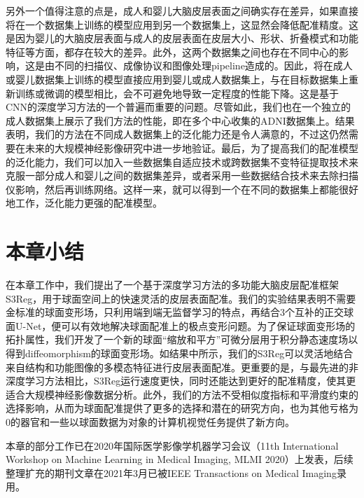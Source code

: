 另外一个值得注意的点是，成人和婴儿大脑皮层表面之间确实存在差异，如果直接将在一个数据集上训练的模型应用到另一个数据集上，这显然会降低配准精度。这是因为婴儿的大脑皮层表面与成人的皮层表面在皮层大小、形状、折叠模式和功能特征等方面，都存在较大的差异\cite{li2015construction}。此外，这两个数据集之间也存在不同中心的影响，这是由不同的扫描仪、成像协议和图像处理pipeline造成的。因此，将在成人或婴儿数据集上训练的模型直接应用到婴儿或成人数据集上，与在目标数据集上重新训练或微调的模型相比，会不可避免地导致一定程度的性能下降。这是基于CNN的深度学习方法的一个普遍而重要的问题\cite{shen2017deep}。尽管如此，我们也在一个独立的成人数据集上展示了我们方法的性能，即在多个中心收集的ADNI数据集上。结果表明，我们的方法在不同成人数据集上的泛化能力还是令人满意的，不过这仍然需要在未来的大规模神经影像研究中进一步地验证。最后，为了提高我们的配准模型的泛化能力，我们可以加入一些数据集自适应技术\cite{he2020self}或跨数据集不变特征提取技术\cite{zhong2020dika}来克服一部分成人和婴儿之间的数据集差异，或者采用一些数据结合技术\cite{zhao2019harmonization}来去除扫描仪影响，然后再训练网络。这样一来，就可以得到一个在不同的数据集上都能很好地工作，泛化能力更强的配准模型。

\section{本章小结}
在本章工作中，我们提出了一个基于深度学习方法的多功能大脑皮层配准框架S3Reg，用于球面空间上的快速灵活的皮层表面配准。我们的实验结果表明不需要金标准的球面变形场，只利用端到端无监督学习的特点，再结合3个互补的正交球面U-Net，便可以有效地解决球面配准上的极点变形问题。为了保证球面变形场的拓扑属性，我们开发了一个新的球面“缩放和平方”可微分层用于积分静态速度场以得到diffeomorphism的球面变形场。如结果中所示，我们的S3Reg可以灵活地结合来自结构和功能图像的多模态特征进行皮层表面配准。更重要的是，与最先进的非深度学习方法相比，S3Reg运行速度更快，同时还能达到更好的配准精度，使其更适合大规模神经影像数据分析。此外，我们的方法不受相似度指标和平滑度约束的选择影响，从而为球面配准提供了更多的选择和潜在的研究方向，也为其他亏格为0的器官和一些以球面数据为对象的计算机视觉任务提供了新方向。

本章的部分工作已在2020年国际医学影像学机器学习会议（11th International Workshop on Machine Learning in Medical Imaging, MLMI 2020）上发表，后续整理扩充的期刊文章在2021年3月已被IEEE Transactions on Medical Imaging录用。










